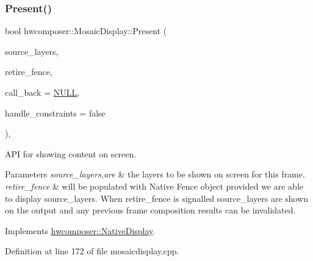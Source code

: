 \subsubsection{\texorpdfstring{Present()}{Present()}}
{\footnotesize\ttfamily bool hwcomposer\+::\+Mosaic\+Display\+::\+Present (\begin{DoxyParamCaption}\item[{std\+::vector$<$ \mbox{\hyperlink{structhwcomposer_1_1HwcLayer}{Hwc\+Layer}} $\ast$$>$ \&}]{source\+\_\+layers,  }\item[{int32\+\_\+t $\ast$}]{retire\+\_\+fence,  }\item[{\mbox{\hyperlink{classhwcomposer_1_1PixelUploaderCallback}{Pixel\+Uploader\+Callback}} $\ast$}]{call\+\_\+back = {\ttfamily \mbox{\hyperlink{alios_2platformdefines_8h_a070d2ce7b6bb7e5c05602aa8c308d0c4}{N\+U\+LL}}},  }\item[{bool}]{handle\+\_\+constraints = {\ttfamily false} }\end{DoxyParamCaption})\hspace{0.3cm}{\ttfamily [override]}, {\ttfamily [virtual]}}

A\+PI for showing content on screen. 
\begin{DoxyParams}{Parameters}
{\em source\+\_\+layers,are} & the layers to be shown on screen for this frame. \\
\hline
{\em retire\+\_\+fence} & will be populated with Native Fence object provided we are able to display source\+\_\+layers. When retire\+\_\+fence is signalled source\+\_\+layers are shown on the output and any previous frame composition results can be invalidated. \\
\hline
\end{DoxyParams}


Implements \mbox{\hyperlink{classhwcomposer_1_1NativeDisplay_a4825b8bc4b85e03b396ed6d2cf5bd8c0}{hwcomposer\+::\+Native\+Display}}.



Definition at line 172 of file mosaicdisplay.\+cpp.


